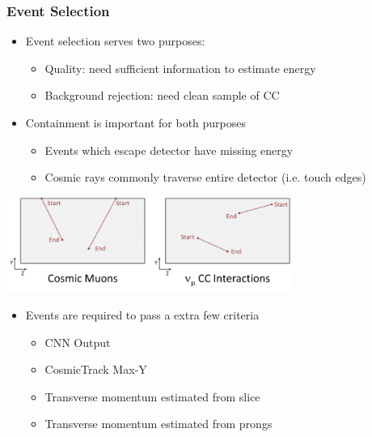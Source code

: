 \documentclass[10pt,professionalfonts,xcolor=table]{beamer}
\begin{document}
\begin{frame}
\frametitle{Event Selection}

\begin{itemize}
\item Event selection serves two purposes:
  \begin{itemize}
  \item Quality: need sufficient information to estimate energy
  \item Background rejection: need clean sample of \numu CC
  \end{itemize}
\item Containment is important for both purposes
  \begin{itemize}
  \item Events which escape detector have missing energy
  \item Cosmic rays commonly traverse entire detector (i.e. touch edges)
  \end{itemize}
\end{itemize}
\begin{center}
 \includegraphics[width=0.7\textwidth]{figures/selection/cosmicmuons.png}
\end{center}

\begin{itemize}
\item Events are required to pass a extra few criteria
\begin{itemize}
\item CNN Output
\item CosmicTrack Max-Y
\item Transverse momentum estimated from slice
\item Transverse momentum estimated from prongs

\end{itemize}
\end{itemize}
\end{frame}
\end{document}
